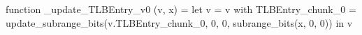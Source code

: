 function _update_TLBEntry_v0 (v, x) = let v = { v with TLBEntry_chunk_0 = update_subrange_bits(v.TLBEntry_chunk_0, 0, 0, subrange_bits(x, 0, 0)) } in
  v
